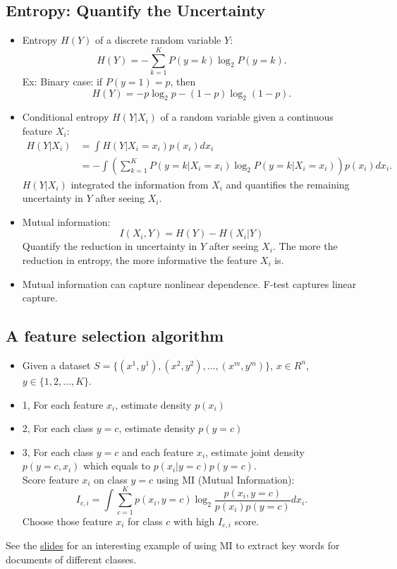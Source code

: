 \documentclass[twoside,12pt]{article}
\begin{document}
\subsection{Entropy: Quantify the Uncertainty}
\begin{itemize}
\item Entropy $H(Y)$ of a discrete random variable $Y$:
$$H(Y) = -\sum_{k=1}^K P(y=k) \log_2 P(y=k).$$
Ex: Binary case: if $P(y=1) = p$, then
 $$H(Y) = -p\log_2 p - (1-p)\log_2(1-p).$$
 
 \item Conditional entropy $H(Y|X_i)$ of a random variable given a continuous feature $X_i$:
  \begin{align*}
  H(Y|X_i) & = \int H(Y| X_i = x_i) p(x_i) dx_i \\
  & = -\int \left ( \sum_{k=1}^K P(y=k|X_i = x_i) \log_2 P(y=k|X_i = x_i) \right ) p(x_i) dx_i. 
  \end{align*}
  $H(Y|X_i)$ integrated the information from $X_i$ and quantifies the remaining uncertainty in $Y$ after seeing $X_i$.
  \item Mutual information: $$I(X_i, Y) = H(Y) - H(X_i | Y)$$
  Quantify the reduction in uncertainty in $Y$ after seeing $X_i$. The more the reduction in entropy, the more informative the feature $X_i$ is.
  \item Mutual information can capture nonlinear dependence. F-test captures linear capture. 
\end{itemize}

\subsection{A feature selection algorithm}
\begin{itemize}
\item Given a dataset $S = \{(x^1,y^1), (x^2, y^2), ..., (x^m, y^m)\}$, $x \in R^n$, $y \in \{1,2, ..., K\}$.
\item 1, For each feature $x_i$, estimate density $p(x_i)$
\item 2, For each class $y = c$, estimate density $p(y=c)$
\item 3, For each class $y = c$ and each feature $x_i$, estimate joint density $p(y=c, x_i)$ which equals to $p(x_i | y =c) p(y=c)$.\\
Score feature $x_i$ on class $y=c$ using MI (Mutual Information):
$$I_{c,i} = \int \sum_{c=1}^K p(x_i, y=c) \log_2 \frac{p(x_i, y = c)}{p(x_i)p(y=c)}dx_i.$$
Choose those feature $x_i$ for class $c$ with high $I_{c,i}$ score.
\end{itemize}
See the \href{https://github.com/sliao7/CSE6740_Computational_Data_Analysis/blob/main/slides/feature_selection.pdf}{slides} for an interesting example of using MI to extract key words for documents of different classes.
\end{document}
